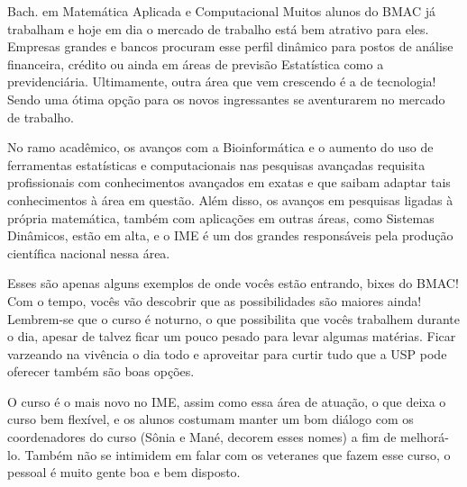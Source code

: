 \begin{subsecao}{Bach. em Matemática Aplicada e Computacional}
Muitos alunos do BMAC já trabalham e hoje em dia o mercado de trabalho está bem atrativo para eles.
Empresas grandes e bancos procuram esse perfil dinâmico para postos de análise
financeira, crédito ou ainda em áreas de previsão Estatística como a
previdenciária. Ultimamente, outra área que vem crescendo é a de tecnologia! Sendo uma
ótima opção para os novos ingressantes se aventurarem no mercado de trabalho.

No ramo acadêmico, os avanços com a Bioinformática e o aumento do uso de
ferramentas estatísticas e computacionais nas pesquisas avançadas requisita
profissionais com conhecimentos avançados em exatas e que saibam adaptar tais
conhecimentos à área em questão. Além disso, os avanços em pesquisas ligadas à
própria matemática, também com aplicações em outras áreas, como Sistemas
Dinâmicos, estão em alta, e o IME é um dos grandes responsáveis pela produção
científica nacional nessa área.

Esses são apenas alguns exemplos de onde vocês estão entrando, bixes do BMAC! Com o tempo,
vocês vão descobrir que as possibilidades são maiores ainda! Lembrem-se que o
curso é noturno, o que possibilita que vocês trabalhem durante o dia, apesar de talvez
ficar um pouco pesado para levar algumas matérias. Ficar varzeando na vivência o dia todo 
e aproveitar para curtir tudo que a USP pode oferecer também são boas opções.

O curso é o mais novo no IME, assim como essa área de atuação, o que deixa o curso
bem flexível, e os alunos costumam manter um bom diálogo com os coordenadores do
curso (Sônia e Mané, decorem esses nomes) a fim de melhorá-lo. Também não se intimidem
em falar com os veteranes que fazem esse curso, o pessoal é muito gente boa e bem disposto.

\end{subsecao}
